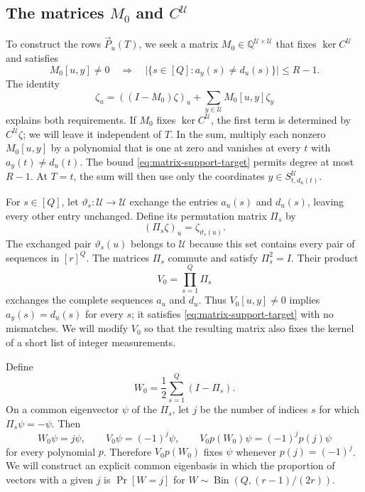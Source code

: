 \subsection{The matrices $M_0$ and $C^{\mathcal U}$}
To construct the rows $\vec{P}_u(T)$, we seek a matrix
$M_0\in\mathbb Q^{\mathcal U\times\mathcal U}$ that fixes
$\ker C^{\mathcal U}$ and satisfies
\begin{equation}\label{eq:matrix-support-target}
 M_0[u,y]\ne0\quad\Longrightarrow\quad
 \bigl|\{s\in[Q]:a_y(s)\ne d_u(s)\}\bigr|\le R-1.
\end{equation}
The identity
\begin{equation}\label{eq:coordinate-decomposition}
 \zeta_u=((I-M_0)\zeta)_u+
          \sum_{y\in\mathcal U}M_0[u,y]\zeta_y
\end{equation}
explains both requirements. If $M_0$ fixes $\ker C^{\mathcal U}$,
the first term is determined by $C^{\mathcal U}\zeta$; we will leave
it independent of $T$. In the sum, multiply each nonzero
$M_0[u,y]$ by a polynomial that is one at zero and vanishes at every
$t$ with $a_y(t)\ne d_u(t)$. The bound
\eqref{eq:matrix-support-target} permits degree at most $R-1$.
At $T=t$, the sum will then use only the coordinates
$y\in S^{\mathcal U}_{t,d_u(t)}$.

For $s\in[Q]$, let $\vartheta_s:\mathcal U\to\mathcal U$ exchange the
entries $a_u(s)$ and $d_u(s)$, leaving every other entry unchanged.
Define its permutation matrix $\Pi_s$ by
\[
 (\Pi_s\zeta)_u=\zeta_{\vartheta_s(u)}.
\]
The exchanged pair $\vartheta_s(u)$ belongs to $\mathcal U$ because this set
contains every pair of sequences in $[r]^Q$. The matrices $\Pi_s$
commute and satisfy $\Pi_s^2=I$. Their product
\[
 V_0=\prod_{s=1}^Q\Pi_s
\]
exchanges the complete sequences $a_u$ and $d_u$. Thus
$V_0[u,y]\ne0$ implies $a_y(s)=d_u(s)$ for every $s$; it satisfies
\eqref{eq:matrix-support-target} with no mismatches. We will modify
$V_0$ so that the resulting matrix also fixes the kernel of a short
list of integer measurements.

Define
\begin{equation}\label{eq:swap-weight}
 W_0=\frac12\sum_{s=1}^Q(I-\Pi_s).
\end{equation}
On a common eigenvector $\psi$ of the $\Pi_s$, let $j$ be the number
of indices $s$ for which $\Pi_s\psi=-\psi$. Then
\[
 W_0\psi=j\psi,\qquad V_0\psi=(-1)^j\psi,
 \qquad V_0p(W_0)\psi=(-1)^jp(j)\psi
\]
for every polynomial $p$. Therefore $V_0p(W_0)$ fixes $\psi$ whenever
$p(j)=(-1)^j$. We will construct an explicit common eigenbasis in which
the proportion of vectors with a given $j$ is
$\Pr[W=j]$ for $W\sim\operatorname{Bin}(Q,(r-1)/(2r))$.

